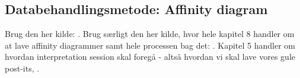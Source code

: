 \subsection{Databehandlingsmetode: Affinity diagram}
\label{ParametreMetodeovervejelserAffinityDiagram}
%
Brug den her kilde: \textcite[ss. 24-28]{PDF:ConsolidationIdeationAffinity}. Brug særligt den her kilde, hvor hele kapitel 8 handler om at lave affinity diagrammer samt hele processen bag det: \textcite[ss. 159-179]{Book:BuildingAnAffinity}. Kapitel 5 handler om hvordan interpretation session skal foregå - altså hvordan vi skal lave vores gule post-its, \textcite[ss. 101-122]{Book:CIInterpretationSession}.
